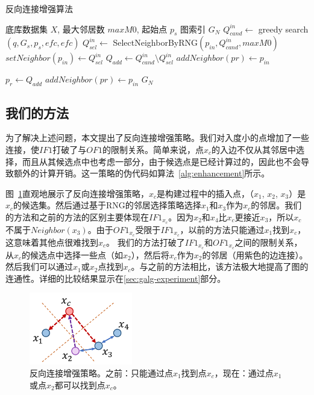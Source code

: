 \begin{algorithm}[tp]
  \caption{反向连接增强算法}
  \label{alg:enhancement} 
  \begin{algorithmic}[1]
      \REQUIRE
      底库数据集 $X$, 最大邻居数 $maxM0$, 起始点 $p_s$
      \ENSURE
      图索引 $G_N$
      \STATE $Q_{cand}^{in} \gets$ greedy search$(q,G_s,p_s,efc,efc)$
      \STATE $Q_{sel}^{in} \gets$ SelectNeighborByRNG$(p_{in},Q_{cand}^{in},maxM0)$
      \STATE $setNeighbor(p_{in}) \gets Q_{sel}^{in}$
      \STATE $Q_{add} \gets Q_{cand}^{in} \setminus Q_{sel}^{in}$
      \STATE $addNeighbor(pr) \gets p_{in}$
      \ENDFOR
      
      \STATE $p_r \gets Q_{add}$
      \STATE $addNeighbor(pr) \gets p_{in}$
      \ENDWHILE
      \ENDFOR
      \RETURN $G_N$
  \end{algorithmic} 
\end{algorithm}

\subsection{我们的方法}
为了解决上述问题，本文提出了反向连接增强策略。我们对入度小的点增加了一些连接，使$IF1$打破了与$OF1$的限制关系。简单来说，点$x_c$的入边不仅从其邻居中选择，而且从其候选点中也考虑一部分，由于候选点是已经计算过的，因此也不会导致额外的计算开销。这一策略的伪代码如算法~\ref{alg:enhancement}所示。

图~\ref{fig:enhence}直观地展示了反向连接增强策略，$x_c$是构建过程中的插入点，（$x_1$, $x_2$, $x_3$）是$x_c$的候选集。然后通过基于RNG的邻居选择策略选择$x_1$和$x_3$作为$x_c$的邻居。我们的方法和之前的方法的区别主要体现在$IF1_{x_c}$。因为$x_2$和$x_4$比$x_c$更接近$x_3$，所以$x_c$不属于$Neighbor(x_3)$。由于$OF1_{x_c}$受限于$IF1_{x_c}$，以前的方法只能通过$x_1$找到$x_c$，这意味着其他点很难找到$x_c$。
我们的方法打破了$IF1_{x_c}$和$OF1_{x_c}$之间的限制关系，从$x_c$的候选点中选择一些点（如$x_2$），然后将$x_c$作为$x_2$的邻居（用紫色的边连接）。然后我们可以通过$x_1$或$x_2$点找到$x_c$。与之前的方法相比，该方法极大地提高了图的连通性。详细的比较结果显示在\ref{sec:galg-experiment}部分。

\begin{figure}[htbp]
  \centering
  \includegraphics[width=0.4\textwidth]{figures/context-1/enhance.pdf}
  \caption{反向连接增强策略。之前：只能通过点$x_1$找到点$x_c$，现在：通过点$x_1$或点$x_2$都可以找到点$x_c$。}
  \label{fig:enhence}
\end{figure}


